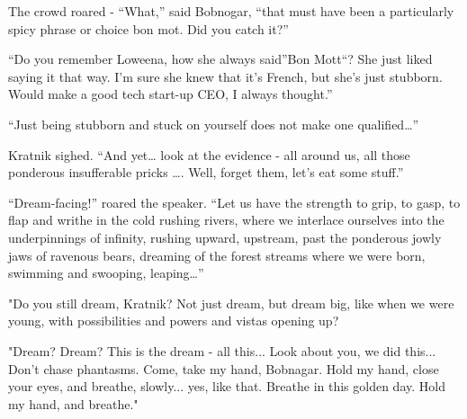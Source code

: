 The crowd roared - ``What,'' said Bobnogar, ``that must have been a
particularly spicy phrase or choice bon mot. Did you catch it?''

``Do you remember Loweena, how she always said''Bon Mott``? She just
liked saying it that way. I'm sure she knew that it's French, but she's
just stubborn. Would make a good tech start-up CEO, I always thought.''

``Just being stubborn and stuck on yourself does not make one
qualified\ldots{}''

Kratnik sighed. ``And yet\ldots{} look at the evidence - all around us,
all those ponderous insufferable pricks \ldots{}. Well, forget them,
let's eat some stuff.''

``Dream-facing!'' roared the speaker. ``Let us have the strength to
grip, to gasp, to flap and writhe in the cold rushing rivers, where we
interlace ourselves into the underpinnings of infinity, rushing upward,
upstream, past the ponderous jowly jaws of ravenous bears, dreaming of
the forest streams where we were born, swimming and swooping,
leaping\ldots{}''

"Do you still dream, Kratnik? Not just dream, but dream big, like when
we were young, with possibilities and powers and vistas opening up?

"Dream? Dream? This is the dream - all this... Look about you, we did
this... Don't chase phantasms. Come, take my hand, Bobnagar. Hold my
hand, close your eyes, and breathe, slowly... yes, like that. Breathe in
this golden day. Hold my hand, and breathe."
